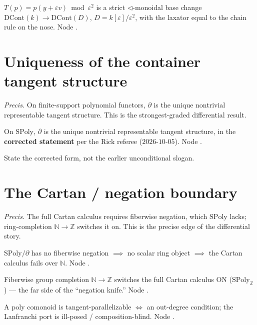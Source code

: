 \documentclass[11pt]{article}
\begin{document}
\begin{theorem}
$T(p)=p(y+εv)\bmod ε^2$ is a strict $\triangleleft$-monoidal base change
$\mathrm{DCont}(k)\to\mathrm{DCont}(D)$, $D=k[ε]/ε^2$, with the laxator equal to the chain rule on
the nose. Node .
\end{theorem}

\section{Uniqueness of the container tangent structure}
\emph{Precis.} On finite-support polynomial functors, $∂$ is the unique nontrivial representable
tangent structure. This is the strongest-graded differential result.

\begin{theorem}
On $\mathrm{SPoly}$, $∂$ is the unique nontrivial representable tangent structure, in the
\textbf{corrected statement} per the Rick referee ($2026\text{-}10\text{-}05$). Node
.
\end{theorem}
\begin{flag}
State the corrected form, not the earlier unconditional slogan.
\end{flag}

\section{The Cartan / negation boundary}
\emph{Precis.} The full Cartan calculus requires fiberwise negation, which $\mathrm{SPoly}$ lacks;
ring-completion $ℕ\to ℤ$ switches it on. This is the precise edge of the differential story.

\begin{theorem}
$\mathrm{SPoly}/∂$ has no fiberwise negation $\implies$ no scalar ring object $\implies$ the Cartan
calculus fails over $ℕ$. Node .
\end{theorem}

\begin{theorem}
Fiberwise group completion $ℕ\to ℤ$ switches the full Cartan calculus ON ($\mathrm{SPoly}_ℤ$) ---
the far side of the ``negation knife.'' Node .
\end{theorem}

\begin{theorem}
A poly comonoid is tangent-parallelizable $\iff$ an out-degree condition; the Lanfranchi port is
ill-posed / composition-blind. Node .
\end{theorem}
\end{document}
